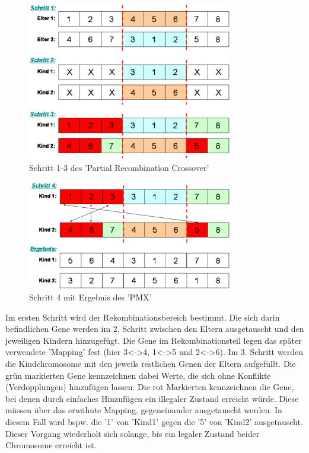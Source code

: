\begin{figure} 
  \centering
  \includegraphics[width=0.8\textwidth]{../images/picRECPM1}
  \caption{Schritt 1-3 des 'Partial Recombination Crossover'}
  \label{fig:RECPM1}
\end{figure}

\begin{figure} 
  \centering
  \includegraphics[width=0.8\textwidth]{../images/picRECPM2}
  \caption{Schritt 4 mit Ergebnis des 'PMX'}
  \label{fig:RECPM2}
\end{figure}

Im ersten Schritt wird der Rekombinationsbereich bestimmt. Die sich
darin befindlichen Gene werden im 2. Schritt zwischen den Eltern
ausgetauscht und den jeweiligen Kindern hinzugefügt. Die Gene
im Rekombinationsteil legen das später verwendete 'Mapping' fest
(hier 3<->4, 1<->5 und 2<->6). Im 3. Schritt
werden die Kindchromosome mit den jeweils restlichen Genen der Eltern
aufgefüllt. Die grün markierten Gene kennzeichnen dabei Werte, die
sich ohne Konflikte (Verdopplungen) hinzufügen lassen. Die rot Markierten
kennzeichnen die Gene, bei denen durch einfaches Hinzufügen ein illegaler
Zustand erreicht würde. Diese müssen über das erwähnte Mapping, gegeneinander
ausgetauscht werden. In diesem Fall wird bspw. die '1' von 'Kind1' gegen
die '5' von 'Kind2' ausgetauscht. Dieser Vorgang wiederholt sich solange, bis ein
legaler Zustand beider Chromosome erreicht ist.  

